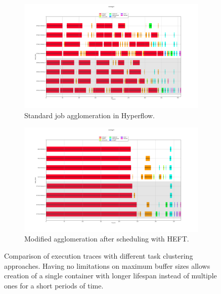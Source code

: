 \begin{figure}[H]
\begin{subfigure}{1\textwidth}
\centering
\includegraphics[width=1\linewidth]{figures/4-2-AggloEMPTY.png}
\caption[Agglo EMPTY]{Standard job agglomeration in Hyperflow.}
\label{fig:solution:agglo:empty}
\end{subfigure}
\begin{subfigure}{1\textwidth}
\centering
\includegraphics[width=1\linewidth]{figures/4-2-AggloHEFT.png}
\caption[Agglo HEFT]{Modified agglomeration after scheduling with HEFT.}
\label{fig:solution:agglo:heft}
\end{subfigure}
\centering

\caption[Differences in execution traces with task clustering]{Comparison of execution traces with different task clustering approaches. Having no limitations on maximum buffer sizes allows creation of a single container with longer lifespan instead of multiple ones for a short periods of time.}


\label{fig:solution:agglo:traces}
\end{figure}
